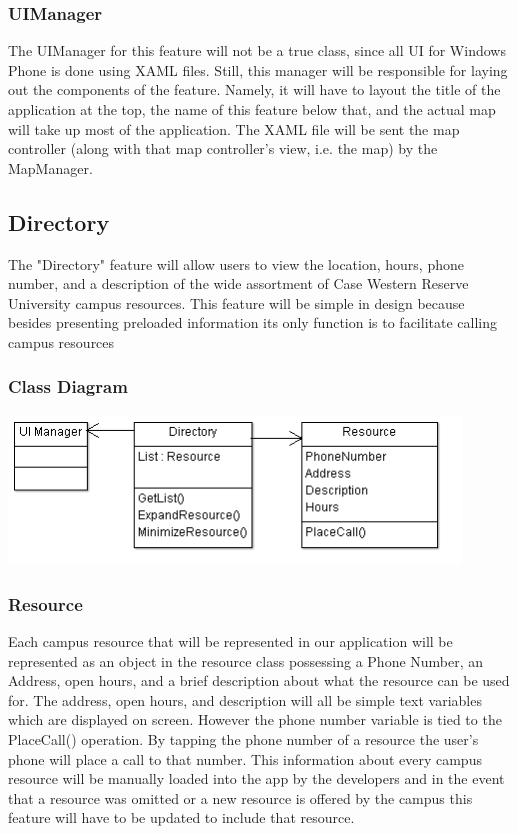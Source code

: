 \documentclass[pdftex,12pt,letter]{article}
\begin{document}
\subsubsection{UIManager}
The UIManager for this feature will not be a true class, since all UI for Windows Phone is done using XAML files. Still, this manager will be responsible for laying out the components of the feature. Namely, it will have to layout the title of the application at the top, the name of this feature below that, and the actual map will take up most of the application. The XAML file will be sent the map controller (along with that map controller's view, i.e. the map)  by the MapManager.
\subsection{Directory}
The "Directory" feature will allow users to view the location, hours, phone number, and a description of the wide assortment of Case Western Reserve University campus resources. This feature will be simple in design because besides presenting preloaded information its only function is to facilitate calling campus resources 
\subsubsection{Class Diagram}
\begin{flushleft}
\includegraphics[width=120mm]{DirectoryCD.png}
\end{flushleft}
\subsubsection{Resource}
Each campus resource that will be represented in our application will be represented as an object in the resource class possessing a Phone Number, an Address, open hours, and a brief description about what the resource can be used for. The address, open hours, and description will all be simple text variables which are displayed on screen. However the phone number variable is tied to the PlaceCall() operation. By tapping the phone number of a resource the user’s phone will place a call to that number. This information about every campus resource will be manually loaded into the app by the developers and in the event that a resource was omitted or a new resource is offered by the campus this feature will have to be updated to include that resource. 
\end{document}
